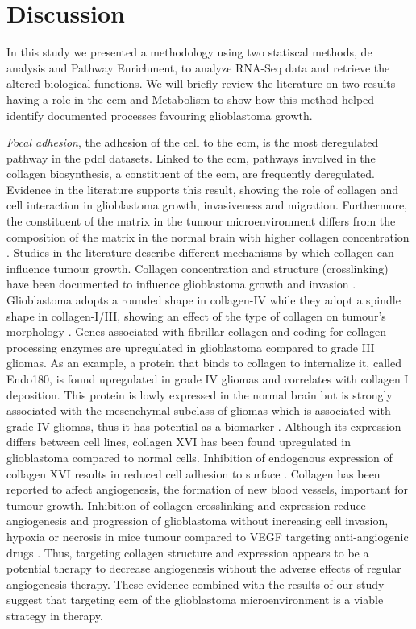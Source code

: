 \section{Discussion}

In this study we presented a methodology using two statiscal methods, \acrlong{de} analysis and Pathway Enrichment, to analyze RNA-Seq data and retrieve the altered biological functions.
We will briefly review the literature on two results having a role in the \acrfull{ecm} and Metabolism to show how this method helped identify documented processes favouring glioblastoma growth.

\textit{Focal adhesion}, the adhesion of the cell to the \acrshort{ecm}, is the most deregulated pathway in the \acrshort{pdcl} datasets.
Linked to the \acrshort{ecm}, pathways involved in the collagen biosynthesis, a constituent of the \acrshort{ecm}, are frequently deregulated.
Evidence in the literature supports this result, showing the role of collagen and cell interaction in glioblastoma growth, invasiveness and migration.
Furthermore, the constituent of the matrix in the tumour microenvironment differs from the composition of the matrix in the normal brain with higher collagen concentration \cite*{Mammoto2013}.
Studies in the literature describe different mechanisms by which collagen can influence tumour growth.
Collagen concentration and structure (crosslinking) have been documented to influence glioblastoma growth and invasion \cite*{Kaphle2019,Kaufman2005,Rao2013}. 
Glioblastoma adopts a rounded shape in collagen-IV while they adopt a spindle shape in collagen-I/III, showing an effect of the type of collagen on tumour's morphology \cite*{Rao2013}.
Genes associated with fibrillar collagen and coding for collagen processing enzymes are upregulated in glioblastoma compared to grade III gliomas.
As an example, a protein that binds to collagen to internalize it, called Endo180, is found upregulated in grade IV gliomas and correlates with collagen I deposition. 
This protein is lowly expressed in the normal brain but is strongly associated with the mesenchymal subclass of gliomas which is associated with grade IV gliomas, thus it has potential as a biomarker \cite*{Huijbers2010}.
Although its expression differs between cell lines, collagen XVI has been found upregulated in glioblastoma compared to normal cells.
Inhibition of endogenous expression of collagen XVI results in reduced cell adhesion to surface \cite*{Senner2008}.
Collagen has been reported to affect angiogenesis, the formation of new blood vessels, important for tumour growth.
Inhibition of collagen crosslinking and expression reduce angiogenesis and progression of glioblastoma without increasing cell invasion, hypoxia or necrosis in mice tumour compared to VEGF targeting anti-angiogenic drugs \cite*{Mammoto2013}.
Thus, targeting collagen structure and expression appears to be a potential therapy to decrease angiogenesis without the adverse effects of regular angiogenesis therapy.
These evidence combined with the results of our study suggest that targeting \acrshort{ecm} of the glioblastoma microenvironment is a viable strategy in therapy.

